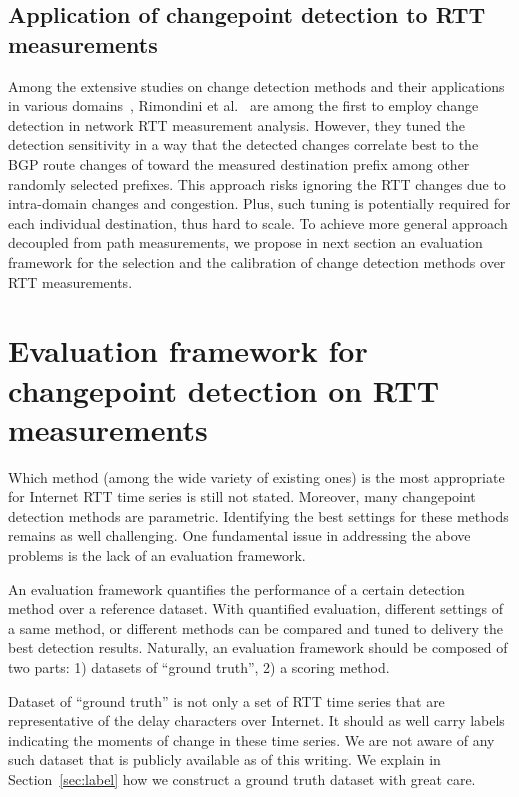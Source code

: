 \subsection{Application of changepoint detection to RTT measurements}
Among the extensive studies on change detection methods and their applications in various domains~\cite{Zhang2007,Reeves2007, Yu2008},
Rimondini et al.~\cite{Rimondini2014} are among the first to employ change detection in network RTT measurement analysis.
However, they tuned the detection sensitivity in a way that the detected changes correlate best to the BGP route changes of toward the measured destination prefix among other randomly selected prefixes.
This approach risks ignoring the RTT changes due to intra-domain changes and congestion.
Plus, such tuning is potentially required for each individual destination, thus hard to scale.
To achieve more general approach decoupled from path measurements, we propose in next section an evaluation framework for the selection and the calibration of change detection methods over RTT measurements.


\section{Evaluation framework for changepoint detection on RTT measurements}
\label{sec:eval_frame}
Which method (among the wide variety of existing ones) is the most appropriate for Internet RTT time series is still not stated. 
Moreover, many changepoint detection methods are parametric. 
Identifying the best settings for these methods remains as well challenging.
One fundamental issue in addressing the above problems is the lack of an evaluation framework.

An evaluation framework quantifies the performance of a certain detection method over a reference dataset.
With quantified evaluation, different settings of a same method, or different methods can be compared and tuned to delivery the best detection results.
Naturally, an evaluation framework should be composed of two parts: 1) datasets of ``ground truth'', 2) a scoring method.

Dataset of ``ground truth'' is not only a set of RTT time series that are representative of the delay characters over Internet.
It should as well carry labels indicating the moments of change in these time series.
We are not aware of any such dataset that is publicly available as of this writing.
We explain in Section~\ref{sec:label} how we construct a ground truth dataset with great care.

